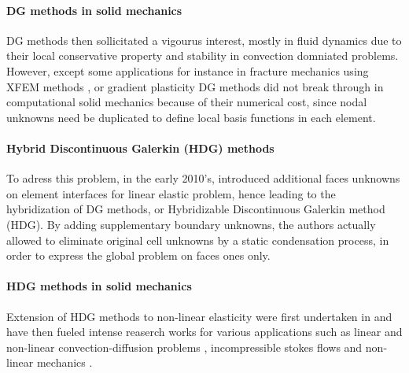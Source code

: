 \paragraph{DG methods in solid mechanics}
%
%
%
DG methods then sollicitated a vigourus interest, mostly in fluid dynamics \cite{shahbazi_high-order_2007, persson_discontinuous_2009} due to their local conservative property and stability in convection domniated problems. However, except some applications for instance in fracture mechanics using XFEM methods \cite{gracie_blending_2008, shen_stability_2010}, or gradient plasticity \cite{djoko_discontinuous_2007,djoko_discontinuous_2007-1} DG methods did not break through in computational solid mechanics because of their numerical cost, since nodal unknowns need be duplicated to define local basis functions in each element.

\paragraph{Hybrid Discontinuous Galerkin (HDG) methods}

To adress this problem, in the early 2010's, \cite{cockburn_unified_2009, soon_hybridizable_2009} introduced additional faces unknowns on element interfaces for linear elastic problem, hence leading to the hybridization of DG methods, or Hybridizable Discontinuous Galerkin method (HDG). By adding supplementary boundary unknowns, the authors actually allowed to eliminate original cell unknowns by a static condensation process, in order to express the global problem on faces ones only.

\paragraph{HDG methods in solid mechanics}

Extension of HDG methods to non-linear elasticity were first undertaken in \cite{soon_hybridizable_2008} and have then fueled intense reaserch works for various applications such as linear and non-linear convection-diffusion problems \cite{nguyen_implicit_2009,nguyen_implicit_2009-1,nguyen_hybridizable_2010}, incompressible stokes flows \cite{nguyen_hybridizable_2010, nguyen_implicit_2011} and non-linear mechanics \cite{nguyen_hybridizable_2012}.

